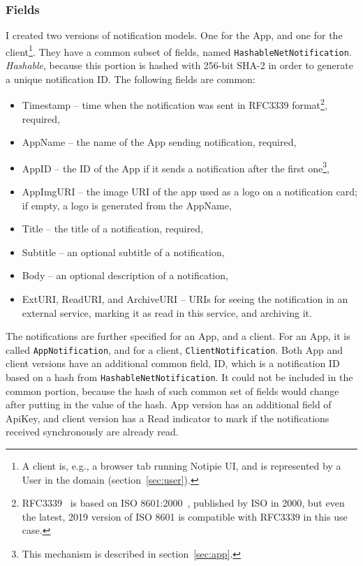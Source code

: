 \subsubsection{Fields}\label{sec:protocol-fields}

I created two versions of notification models.
One for the App,
and one for the client\footnote{
  A client is, e.g.,
  a browser tab running Notipie \ac{UI},
  and is represented
  by a User in the domain (section~\ref{sec:user}).
}.
They have a common subset of fields,
named \texttt{HashableNetNotification}.
\textit{Hashable},
because this portion is hashed with 256-bit \ac{SHA-2}
in order to generate a unique notification \ac{ID}.
The following fields are common:

\begin{itemize}
  \item Timestamp -- time when the notification was sent
        in RFC3339 format\footnote{
          RFC3339~\cite{clyne_rfc3339_2002} is based on
          ISO 8601:2000~\cite{international_organization_for_standardization_iso_2000},
          published by \ac{ISO} in 2000,
          but even the latest, 2019 version of ISO 8601
          is compatible with RFC3339 in this use case.
        }, required,
  \item AppName -- the name of the App sending notification, required,
  \item AppID -- the \ac{ID} of the App
        if it sends a notification after the first one\footnote{
          This mechanism is described in section~\ref{sec:app}.
        },
  \item AppImgURI -- the image \ac{URI} of the app
        used as a logo on a notification card;
        if empty, a logo is generated from the AppName,
  \item Title -- the title of a notification, required,
  \item Subtitle -- an optional subtitle of a notification,
  \item Body -- an optional description of a notification,
  \item ExtURI, ReadURI, and ArchiveURI -- \acp{URI}
        for seeing the notification in an external service,
        marking it as read in this service, and archiving it.
\end{itemize}

The notifications are further specified
for an App, and a client.
For an App, it is called \texttt{AppNotification},
and for a client, \texttt{ClientNotification}.
Both App and client versions
have an additional common field, \ac{ID},
which is a notification \ac{ID}
based on a hash from \texttt{HashableNetNotification}.
It could not be included in the common portion,
because the hash of such common set of fields
would change after putting in the value of the hash.
App version has an additional field of ApiKey,
and client version has a Read indicator
to mark if the notifications received
synchronously are already read.
